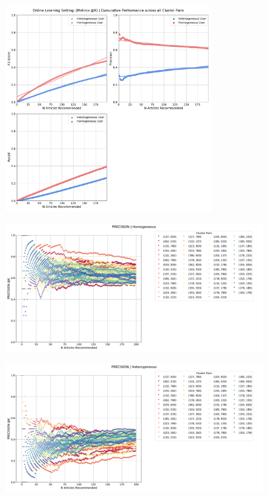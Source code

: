 \documentclass[a4paper,fontsize=8.0pt]{scrartcl}
\begin{document}
\vspace{1ex}
\begin{figure}[H]
 \includegraphics[width=0.8\textwidth]{Graphs/user_interaction_vs_model_performance_cumu.pdf}
\end{figure}
\vspace{-4ex}
\begin{figure}[H]
 \includegraphics[width=1.0\textwidth]{Graphs/user_interaction_vs_model_performance_precision_all_cps_Homogeneous.pdf}
\end{figure}
\begin{figure}[H]
 \includegraphics[width=1.0\textwidth]{Graphs/user_interaction_vs_model_performance_precision_all_cps_Heterogeneous.pdf}
\end{figure}
\end{document}
